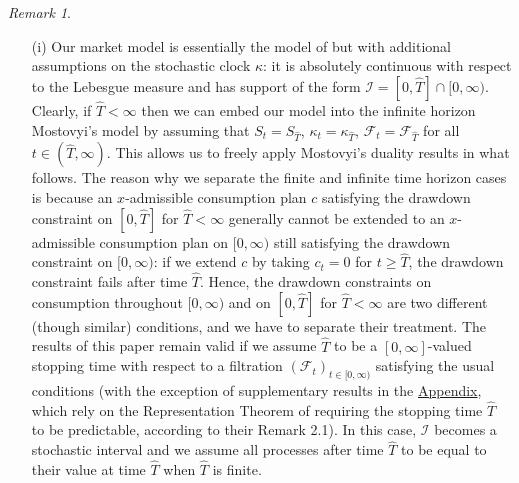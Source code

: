 \documentclass[11pt, oneside]{article}   	%
\theoremstyle{plain}
\theoremstyle{definition}
\theoremstyle{remark}
\newtheorem{rem}[thm]{Remark}
\begin{document}
\begin{rem}\label{rem:on-model}
\begin{enumerate}
\item[(i)] Our market model is essentially the model of \cite{mostovyi} but with additional assumptions on the stochastic clock $\kappa$: it is absolutely continuous with respect to the Lebesgue measure and has support of the form $\mathcal{I}=[0,\hat{T}]\cap[0,\infty)$. Clearly, if $\hat{T}<\infty$ then we can embed our model into the infinite horizon Mostovyi's model by assuming that $S_t=S_{\hat{T}}$, $\kappa_t=\kappa_{\hat{T}}$, $\mathcal{F}_t=\mathcal{F}_{\hat{T}}$ for all $t\in(\hat{T},\infty)$. This allows us to freely apply Mostovyi's duality results in what follows. The reason why we separate the finite and infinite time horizon cases is because an $x$-admissible consumption plan $c$ satisfying the drawdown constraint on $[0,\hat{T}]$ for $\hat{T}<\infty$ generally cannot be extended to an $x$-admissible consumption plan on $[0,\infty)$ still satisfying the drawdown constraint on $[0,\infty)$: if we extend $c$ by taking $c_t=0$ for $t\geq \hat{T}$, the drawdown constraint fails after time $\hat{T}$. Hence, the drawdown constraints on consumption throughout $[0,\infty)$ and on $[0,\hat{T}]$ for $\hat{T}<\infty$ are two different (though similar) conditions, and we have to separate their treatment. The results of this paper remain valid if we assume $\hat{T}$ to be a $[0,\infty]$-valued stopping time with respect to a filtration $(\mathcal{F}_{t})_{t\in[0,\infty)}$ satisfying the usual conditions (with the exception of supplementary results in the \hyperref[app:envelope]{Appendix}, which rely on the Representation Theorem of \cite{bank-el-karoui} requiring the stopping time $\hat{T}$ to be predictable, according to their Remark 2.1). In this case, $\mathcal{I}$ becomes a stochastic interval and we assume all processes after time $\hat{T}$ to be equal to their value at time $\hat{T}$ when $\hat{T}$ is finite.

\end{enumerate}
\end{rem}
\end{document}
